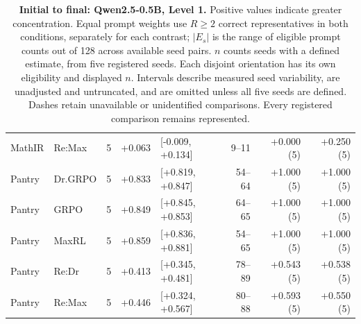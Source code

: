 \begin{table}[!htbp]
\begin{tabular}{@{}llcrlrrr@{}}
MathIR & Re:Max & 5 & +0.063 & [-0.009, +0.134] & 9--11 & +0.000 (5) & +0.250 (5) \\
Pantry & Dr.GRPO & 5 & +0.833 & [+0.819, +0.847] & 54--64 & +1.000 (5) & +1.000 (5) \\
Pantry & GRPO & 5 & +0.849 & [+0.845, +0.853] & 64--65 & +1.000 (5) & +1.000 (5) \\
Pantry & MaxRL & 5 & +0.859 & [+0.836, +0.881] & 54--65 & +1.000 (5) & +1.000 (5) \\
Pantry & Re:Dr & 5 & +0.413 & [+0.345, +0.481] & 78--89 & +0.543 (5) & +0.538 (5) \\
Pantry & Re:Max & 5 & +0.446 & [+0.324, +0.567] & 80--88 & +0.593 (5) & +0.550 (5) \\
\bottomrule
\end{tabular}
\caption{\textbf{Initial to final: Qwen2.5-0.5B, Level 1.} Positive values indicate greater concentration. Equal prompt weights use $R\ge2$ correct representatives in both conditions, separately for each contrast; $|E_s|$ is the range of eligible prompt counts out of 128 across available seed pairs. $n$ counts seeds with a defined estimate, from five registered seeds. Each disjoint orientation has its own eligibility and displayed $n$. Intervals describe measured seed variability, are unadjusted and untruncated, and are omitted unless all five seeds are defined. Dashes retain unavailable or unidentified comparisons. Every registered comparison remains represented.}
\end{table}

